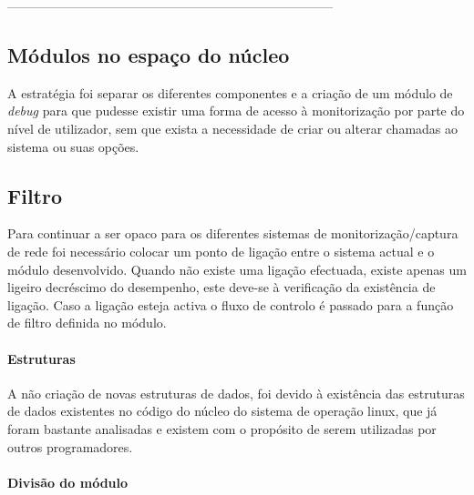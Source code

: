 

-----------------------------------------------------------------------------



\subsection{Módulos no espaço do núcleo}
A estratégia foi separar os diferentes componentes e a criação de um módulo de \textit{debug} para que pudesse existir uma forma de acesso à monitorização por parte do nível de utilizador, sem que exista a necessidade de criar ou alterar chamadas ao sistema ou suas opções.

\subsection{Filtro}

Para continuar a ser opaco para os diferentes sistemas de monitorização/captura de rede foi necessário colocar um ponto de ligação entre o sistema actual e o módulo desenvolvido. Quando não existe uma ligação efectuada, existe apenas um ligeiro decréscimo do desempenho, este deve-se à verificação da existência de ligação. Caso a ligação esteja activa o fluxo de controlo é passado para a função de filtro definida no módulo.


\paragraph{Estruturas}

A não criação de novas estruturas de dados, foi devido à existência das
estruturas de dados existentes no código do núcleo do sistema de operação
linux, que já foram bastante analisadas e existem com o propósito de serem
utilizadas por outros programadores.

\paragraph{Divisão do módulo} 

